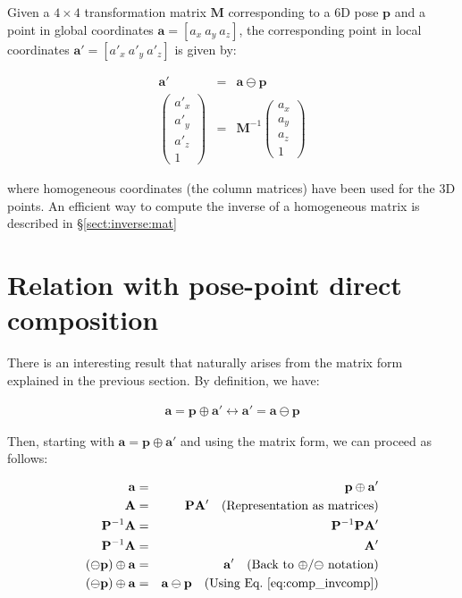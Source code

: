 \documentclass[a4paper,11pt]{report}
\begin{document}
Given a $4\times 4$ transformation matrix $\mathbf{M}$ corresponding to a 6D pose
$\mathbf{p}$ and a point in global coordinates
$\mathbf{a} = [a_x ~ a_y ~ a_z]$, the corresponding point in local coordinates
$\mathbf{a'} = [a'_x ~ a'_y ~ a'_z]$ is given by:

\begin{eqnarray}
\mathbf{a'} &=& \mathbf{a} \ominus \mathbf{p} \nonumber \\
\left(\begin{array}{c}
 a'_x \\ a'_y \\ a'_z \\ 1
\end{array}\right)
&=&
\mathbf{M}^{-1}
\left(\begin{array}{c}
 a_x \\ a_y \\ a_z \\ 1
\end{array}\right)
\end{eqnarray}

\noindent where homogeneous coordinates (the column matrices) have been used for the 3D points.
An efficient way to compute the inverse of a homogeneous matrix is
described in \S \ref{sect:inverse:mat}


\section{Relation with pose-point direct composition}

There is an interesting result that naturally arises from the matrix form
explained in the previous section.
By definition, we have:

\begin{eqnarray}
 \mathbf{a} = \mathbf{p} \oplus \mathbf{a'}
\leftrightarrow
 \mathbf{a'} = \mathbf{a} \ominus \mathbf{p}
\label{eq:comp_invcomp}
\end{eqnarray}

Then, starting with $\mathbf{a} = \mathbf{p} \oplus \mathbf{a'}$
and using the matrix form, we can proceed as follows:

\begin{eqnarray*}
 \mathbf{a} &=& \mathbf{p} \oplus \mathbf{a'}    \\
 \mathbf{A} &=& \mathbf{P}  \mathbf{A'}  \quad \text{(Representation as matrices)}  \\
 \mathbf{P}^{-1} \mathbf{A} &=& \mathbf{P}^{-1} \mathbf{P}  \mathbf{A'} \\
 \mathbf{P}^{-1} \mathbf{A} &=& \mathbf{A'}  \\
 (\ominus \mathbf{p}) \oplus \mathbf{a} &=& \mathbf{a'}  \quad \text{(Back to $\oplus$/$\ominus$ notation)} \\
 (\ominus \mathbf{p}) \oplus \mathbf{a} &=& \mathbf{a} \ominus \mathbf{p}  \quad \text{(Using Eq.~\ref{eq:comp_invcomp})}
\end{eqnarray*}
\end{document}
